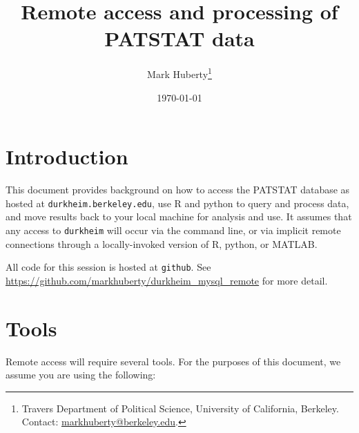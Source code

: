 \documentclass[11pt]{article}
\title{Remote access and processing of PATSTAT data}
\author{Mark Huberty\thanks{Travers Department of Political Science,
    University of California, Berkeley. Contact:
    \url{markhuberty@berkeley.edu}.}}
\date{\today}
\begin{document}
%
\maketitle
\doublespacing

\section{Introduction}
\label{sec:introduction}

This document provides background on how to access the PATSTAT
database as hosted at \texttt{durkheim.berkeley.edu}, use R and python
to query and process data, and move results back to your local machine
for analysis and use. It assumes that any access to \texttt{durkheim}
will occur via the command line, or via implicit remote connections
through a locally-invoked version of R, python, or MATLAB. 

All code for this session is hosted at \texttt{github}. See
\url{https://github.com/markhuberty/durkheim_mysql_remote} for more
detail. 


\section{Tools}
\label{sec:tools}

Remote access will require several tools. For the purposes of this
document, we assume you are using the following:
\end{document}
